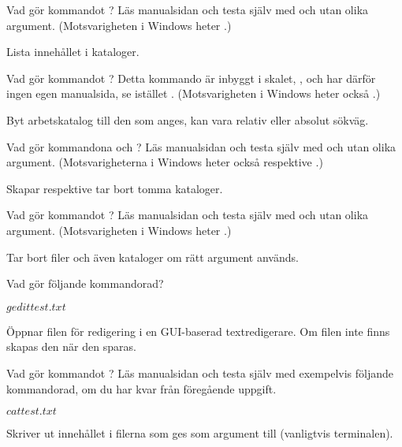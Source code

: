 \documentclass[a4paper,nocourse]{miunasgn}
\begin{document}
\begin{questions}
  \question\label{q:ls}
  Vad gör kommandot ?
  Läs manualsidan och testa själv med och utan olika argument.
  (Motsvarigheten i Windows heter .)
  \begin{solution}
    Lista innehållet i kataloger.
  \end{solution}

  \question\label{q:cd}
  Vad gör kommandot ?
  Detta kommando är inbyggt i skalet, , och har därför ingen egen 
  manualsida, se istället .
  (Motsvarigheten i Windows heter också .)
  \begin{solution}
    Byt arbetskatalog till den som anges, kan vara relativ eller absolut 
    sökväg.
  \end{solution}

  \question\label{q:mkdir}
  Vad gör kommandona  och ?
  Läs manualsidan och testa själv med och utan olika argument.
  (Motsvarigheterna i Windows heter också  respektive 
  .)
  \begin{solution}
    Skapar respektive tar bort tomma kataloger.
  \end{solution}

  \question\label{q:rm}
  Vad gör kommandot ?
  Läs manualsidan och testa själv med och utan olika argument.
  (Motsvarigheten i Windows heter .)
  \begin{solution}
    Tar bort filer och även kataloger om rätt argument används.
  \end{solution}

  \question\label{q:gedit}
  Vad gör följande kommandorad?
  \begin{terminal}
$ gedit test.txt
$
  \end{terminal}
  \begin{solution}
    Öppnar filen  för redigering i en GUI-baserad 
    textredigerare.
    Om filen inte finns skapas den när den sparas.
  \end{solution}

  \question\label{q:cat}
  Vad gör kommandot ?
  Läs manualsidan och testa själv med exempelvis följande kommandorad, om du 
  har kvar  från föregående uppgift.
  \begin{terminal}
$ cat test.txt
$
  \end{terminal}
  \begin{solution}
    Skriver ut innehållet i filerna som ges som argument till  
    (vanligtvis terminalen).
  \end{solution}


\end{questions}
\end{document}
